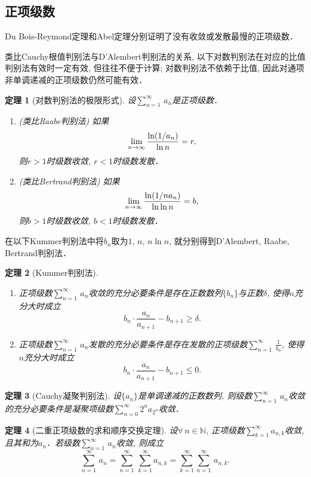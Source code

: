 \documentclass[11pt,a4paper]{ctexart}
\theoremstyle{thmseries} %
\newtheorem{thm}{定理}[section]
\theoremstyle{exerseries}
\newcommand{\bra}[1]{\mathopen{}\left(#1\right)}
\newcommand{\N}{\mathbb{N}}
\def \nti {\mathnormal{n}\to\infty}
\def \tseries {{\textstyle\sum\limits_{n=1}^{\infty}}\,} %
\def \dseries {\sum_{n=1}^{\infty}\,} %
\def \vs {\vspace{-1em}}
\begin{document}
\subsection{正项级数}
Du Bois-Reymond定理和Abel定理分别证明了没有收敛或发散最慢的正项级数．

类比Cauchy根值判别法与D'Alembert判别法的关系, 以下对数判别法在对应的比值判别法有效时一定有效, 但往往不便于计算; 对数判别法不依赖于比值, 因此对通项非单调递减的正项级数仍然可能有效．
\begin{thm}[对数判别法的极限形式]
	设$\tseries a_n$是正项级数．
	\begin{enumerate}
		\item (类比Raabe判别法) 如果
		\[\lim_{\nti}\frac{\ln\bra{1/a_n}}{\ln n}=r,\]
		则$r>1$时级数收敛, $r<1$时级数发散．
		\item (类比Bertrand判别法) 如果
		\[\lim_{\nti}\frac{\ln\bra{1/na_n}}{\ln\ln n}=b,\]
		则$b>1$时级数收敛, $b<1$时级数发散．
	\end{enumerate}
\end{thm}

在以下Kummer判别法中将$b_n$取为$1,\,n,\,n\ln n$, 就分别得到D'Alembert, Raabe, Bertrand判别法．
\begin{thm}[Kummer判别法]
	\phantom{text}
	\begin{enumerate}
		\item 正项级数$\tseries a_n$收敛的充分必要条件是存在正数数列$\{b_n\}$与正数$\delta$, 使得$n$充分大时成立\vs
		\[b_n\cdot\frac{a_n}{a_{n+1}}-b_{n+1}\geq\delta.\]\vs\vs
		\item 正项级数$\tseries a_n$发散的充分必要条件是存在发散的正项级数$\tseries\frac{1}{b_n}$, 使得$n$充分大时成立\vs
		\[b_n\cdot\frac{a_n}{a_{n+1}}-b_{n+1}\leq0.\]\vs
	\end{enumerate}\vspace{-1.5em}
\end{thm}

\begin{thm}[Cauchy凝聚判别法]
	设$\{a_n\}$是单调递减的正数数列, 则级数$\tseries a_n$收敛的充分必要条件是凝聚项级数$\textstyle\sum\limits_{n=0}^{\infty}2^na_{2^n}$收敛．
\end{thm}

\begin{thm}[二重正项级数的求和顺序交换定理]
	设$\forall\,n\in\N$, 正项级数$\textstyle\sum\limits_{k=1}^{\infty}\displaystyle a_{n,k}$收敛, 且其和为$a_n$．若级数$\tseries a_n$收敛, 则成立
	\[\dseries a_n=\dseries\sum_{k=1}^{\infty}a_{n,k}=\sum_{k=1}^{\infty}\dseries a_{n,k}.\]
\end{thm}
\end{document}
